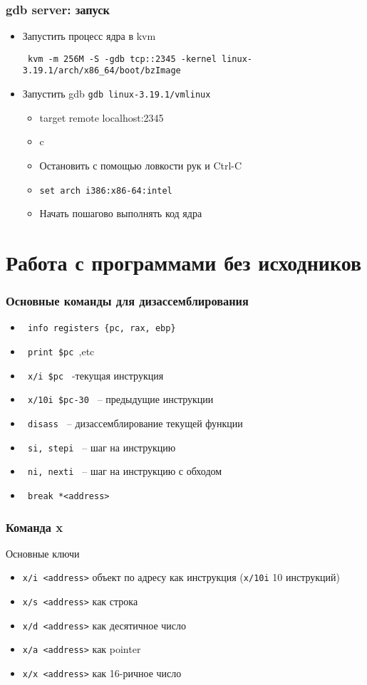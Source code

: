\begin{frame}
  \frametitle{gdb server: запуск}
\begin{itemize}
    \item Запустить процесс ядра в kvm

      \texttt{ kvm -m 256M -S -gdb tcp::2345 -kernel linux-3.19.1/arch/x86\_64/boot/bzImage }
    \item Запустить gdb \texttt{gdb linux-3.19.1/vmlinux}
    \begin{itemize}
      \item target remote localhost:2345
      \item c
      \item Остановить с помощью ловкости рук и Ctrl-C
      \item \texttt{set arch i386:x86-64:intel}
      \item Начать пошагово выполнять код ядра
    \end{itemize}
\end{itemize}
\end{frame}
  
\section[gdb disasm]{Работа с программами без исходников}
\begin{frame}[fragile]
  \frametitle{Основные команды для дизассемблирования}
  \begin{itemize}
    \item \verb+ info registers {pc, rax, ebp} +
    \item \verb+ print $pc +,etc
    \item \verb+ x/i $pc + -текущая инструкция
    \item \verb+ x/10i $pc-30 + -- предыдущие инструкции
    \item \verb+ disass + -- дизассемблирование текущей функции
    \item \verb+ si, stepi + -- шаг на инструкцию
    \item \verb+ ni, nexti + -- шаг на инструкцию с обходом
    \item \verb+ break *<address> +
  \end{itemize}
\end{frame}

\begin{frame}
  \frametitle{Команда x}
  Основные ключи
  \begin{itemize}
    \item \texttt{x/i <address>} объект по адресу как инструкция (\texttt{x/10i} 10 инструкций)
    \item \texttt{x/s <address>} как строка
    \item \texttt{x/d <address>} как десятичное число
    \item \texttt{x/a <address>} как pointer
    \item \texttt{x/x <address>} как 16-ричное число
  \end{itemize}
\end{frame}

